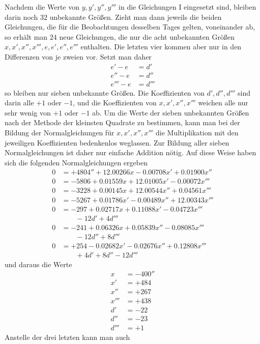 Nachdem die Werte von $y,y',y'',y'''$ in die Gleichungen I eingesetzt sind, bleiben darin noch $32$ unbekannte Größen. Zieht man dann jeweils die beiden Gleichungen, die für die Beobachtungen desselben Tages gelten, voneinander ab, so erhält man $24$ neue Gleichungen, die nur die acht unbekannten Größen $x,x',x'',x''',e,e',e'',e'''$ enthalten. Die letzten vier kommen aber nur in den Differenzen von je zweien vor. Setzt man daher
\[
\begin{aligned}
e'-e&=d'\\
e''-e&=d''\\
e'''-e&=d'''
\end{aligned}
\]
so bleiben nur sieben unbekannte Größen. Die Koeffizienten von $d',d'',d'''$ sind darin alle $+1$ oder $-1$, und die Koeffizienten von $x,x',x'',x'''$ weichen alle nur sehr wenig von $+1$ oder $-1$ ab. Um die Werte der sieben unbekannten Größen nach der Methode der kleinsten Quadrate zu bestimmen, kann man bei der Bildung der Normalgleichungen für $x,x',x'',x'''$ die Multiplikation mit den jeweiligen Koeffizienten bedenkenlos weglassen. Zur Bildung aller sieben Normalgleichungen ist daher nur einfache Addition nötig. Auf diese Weise haben sich die folgenden Normalgleichungen ergeben
\[
\begin{aligned}
0&=+4804''+12.00266x-0.00708x'+0.01900x''\\
0&=-5806+0.01559x+12.01005x'-0.00072x'''\\
0&=-3228+0.00145x+12.00544x''+0.04561x'''\\
0&=-5267+0.01786x'-0.00489x''+12.00343x'''\\
0&=-297+0.02717x+0.11088x'-0.04723x'''\\
 &\qquad-12d'+4d'''\\
0&=-241+0.06326x+0.05839x''-0.08085x'''\\
 &\qquad-12d''+8d'''\\
0&=+254-0.02682x'-0.02676x''+0.12808x'''\\
 &\qquad+4d'+8d''-12d'''
\end{aligned}
\]
und daraus die Werte
\[
\begin{aligned}
x&=-400''\\
x'&=+484\\
x''&=+267\\
x'''&=+438\\
d'&=-22\\
d''&=-23\\
d'''&=+1
\end{aligned}
\]
Anstelle der drei letzten kann man auch
